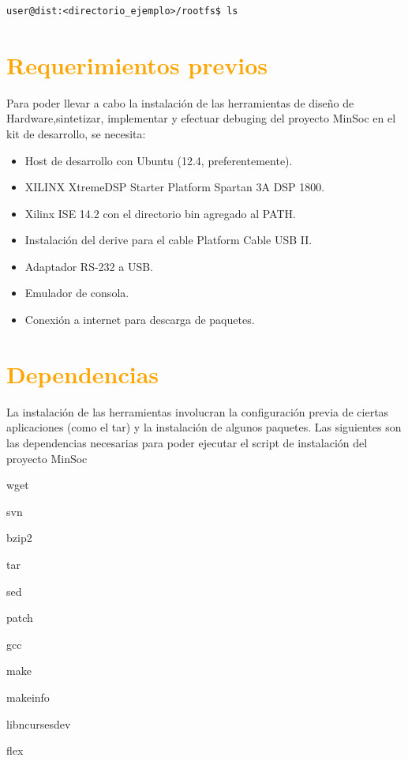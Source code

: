 \begin{verbatim}
user@dist:<directorio_ejemplo>/rootfs$ ls
\end{verbatim}

\section{\textcolor{orange}{Requerimientos previos}}

 Para poder llevar a cabo la instalación de las herramientas de diseño de Hardware,sintetizar, implementar y efectuar debuging  del proyecto MinSoc en el kit de desarrollo, se necesita:

\begin{itemize}
\item Host de desarrollo con Ubuntu (12.4, preferentemente).
\item XILINX XtremeDSP Starter Platform Spartan 3A DSP 1800.
\item Xilinx ISE 14.2 con el directorio bin agregado al PATH.
\item Instalación del derive para el cable Platform Cable USB II.
\item Adaptador RS-232 a USB.
\item Emulador de consola.
\item Conexión a internet para descarga de paquetes.

\end{itemize} 

\newpage

\section{\textcolor{orange}{Dependencias}}

La instalación de las herramientas involucran la configuración previa de ciertas aplicaciones (como el tar) y la instalación de algunos paquetes.
Las siguientes son las dependencias necesarias para poder ejecutar el script de instalación del proyecto MinSoc

wget

svn

bzip2

tar

sed

patch

gcc

make

makeinfo

libncurses\-dev

flex

